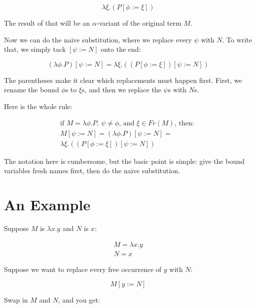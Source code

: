 \documentclass{book}
\numberwithin{equation}{chapter}
\begin{document}
\begin{equation}
\lambda \xi.(P[\phi := \xi])
\end{equation}

\noindent
The result of that will be an $\alpha$-variant of the original term $M$.

Now we can do the naive substitution, where we replace every $\psi$ with $N$. To write that, we simply tack $[\psi := N]$ onto the end:

\begin{equation}
(\lambda \phi.P)[\psi := N] = \lambda \xi.((P[\phi := \xi])[\psi := N])
\end{equation}
 
\noindent
The parentheses make it clear which replacements must happen first. First, we rename the bound $\phi$s to $\xi$s, and then we replace the $\psi$s with $N$s. 

Here is the whole rule:

\begin{multline}
\text{if $M = \lambda \phi.P$, $\psi \not = \phi$, and $\xi \in Fr(M)$, then: } \\ 
M[\psi := N] = (\lambda \phi.P)[\psi := N] = \\
\lambda \xi.((P[\phi := \xi])[\psi := N])
\end{multline}

\noindent
The notation here is cumbersome, but the basic point is simple: give the bound variables fresh names first, then do the naive substitution.


\section{An Example}

Suppose $M$ is $\lambda x.y$ and $N$ is $x$:

\begin{align}
M = \lambda x.y \\
N = x
\end{align}

\noindent
Suppose we want to replace every free occurrence of $y$ with $N$:

\begin{equation}
M[y := N]
\end{equation}

\noindent
Swap in $M$ and $N$, and you get:
\end{document}
